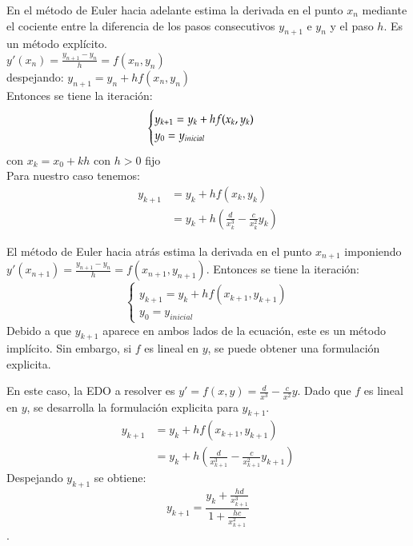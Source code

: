 \documentclass{endm}
\begin{document}
En el método de Euler hacia adelante estima la derivada en el punto $x_{n}$ mediante el cociente entre la diferencia de los pasos consecutivos $y_{n+1}$ e $y_{n}$ y el paso $h$. Es un método explícito.\\
$y'(x_{n}) = \frac{y_{n+1} - y_n}{h} = f(x_{n},y_{n})$\\
despejando:
$y_{n+1} = y_n + hf(x_{n},y_{n})$ \\

Entonces se tiene la iteración:
\begin{equation*}
\begin{cases}
    y_{k+1} = y_k + hf(x_{k},y_{k}) \\
    y_0 = y_{inicial}
\end{cases}\\
\end{equation*}
con $x_{k} = x_{0} + kh$ con  $h>0$ fijo \\
Para nuestro caso tenemos:
\begin{align*}
    y_{k+1} &= y_k + hf(x_{k},y_{k}) \\
    &= y_k + h\left( \frac{d}{x_{k}^3} - \frac{c}{x_{k}^2}y_{k} \right)
\end{align*}


El método de Euler hacia atrás estima la derivada en el punto $x_{n+1}$ imponiendo $y'(x_{n+1}) = \frac{y_{n+1} - y_n}{h} = f(x_{n+1},y_{n+1})$.
Entonces se tiene la iteración:
\begin{equation*}
\begin{cases}
    y_{k+1} = y_k + hf(x_{k+1},y_{k+1}) \\
    y_0 = y_{inicial}
\end{cases}
\end{equation*}
Debido a que $y_{k+1}$ aparece en ambos lados de la ecuación, este es un método implícito. Sin embargo, si
$f$ es lineal en $y$, se puede obtener una formulación explicita.

En este caso, la EDO a resolver es $y' = f(x,y) = \frac{d}{x^3} - \frac{c}{x^2}y$. Dado que $f$ es lineal en $y$, se desarrolla
la formulación explicita para $y_{k+1}$.
\begin{align*}
    y_{k+1} &= y_k + hf(x_{k+1},y_{k+1}) \\
    &= y_k + h\left( \frac{d}{x_{k+1}^3} - \frac{c}{x_{k+1}^2}y_{k+1} \right)
\end{align*}
Despejando $y_{k+1}$ se obtiene:
\begin{equation}
    y_{k+1} = \frac{y_k + \frac{hd}{x_{k+1}^3}}{1 + \frac{hc}{x_{k+1}^2}}
\end{equation}.\\
\end{document}
